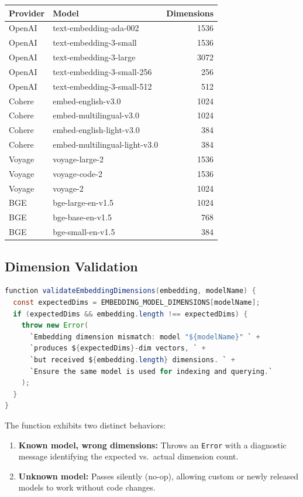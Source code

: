 \documentclass[11pt]{article}
\begin{document}
\begin{longtable}{llr}
\toprule
\textbf{Provider} & \textbf{Model} & \textbf{Dimensions} \\
\midrule
\endhead
OpenAI & text-embedding-ada-002 & 1536 \\
OpenAI & text-embedding-3-small & 1536 \\
OpenAI & text-embedding-3-large & 3072 \\
OpenAI & text-embedding-3-small-256 & 256 \\
OpenAI & text-embedding-3-small-512 & 512 \\
Cohere & embed-english-v3.0 & 1024 \\
Cohere & embed-multilingual-v3.0 & 1024 \\
Cohere & embed-english-light-v3.0 & 384 \\
Cohere & embed-multilingual-light-v3.0 & 384 \\
Voyage & voyage-large-2 & 1536 \\
Voyage & voyage-code-2 & 1536 \\
Voyage & voyage-2 & 1024 \\
BGE & bge-large-en-v1.5 & 1024 \\
BGE & bge-base-en-v1.5 & 768 \\
BGE & bge-small-en-v1.5 & 384 \\
\bottomrule
\end{longtable}

\subsection{Dimension Validation}

\begin{lstlisting}[language=Java,caption={validateEmbeddingDimensions() --- lines 104--112}]
function validateEmbeddingDimensions(embedding, modelName) {
  const expectedDims = EMBEDDING_MODEL_DIMENSIONS[modelName];
  if (expectedDims && embedding.length !== expectedDims) {
    throw new Error(
      `Embedding dimension mismatch: model "${modelName}" ` +
      `produces ${expectedDims}-dim vectors, ` +
      `but received ${embedding.length} dimensions. ` +
      `Ensure the same model is used for indexing and querying.`
    );
  }
}
\end{lstlisting}

The function exhibits two distinct behaviors:
\begin{enumerate}
  \item \textbf{Known model, wrong dimensions:} Throws an \texttt{Error} with a
        diagnostic message identifying the expected vs.\ actual dimension count.
  \item \textbf{Unknown model:} Passes silently (no-op), allowing custom or
        newly released models to work without code changes.
\end{enumerate}
\end{document}
